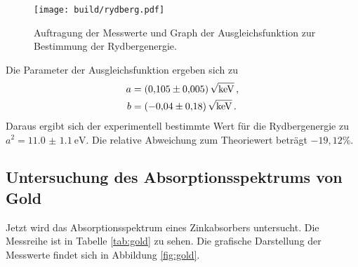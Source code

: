 \begin{figure}
  \centering
  \texttt{[image: build/rydberg.pdf]}
  \caption{Auftragung der Messwerte und Graph der Ausgleichsfunktion zur Bestimmung der Rydbergenergie.}
  \label{fig:rydberg}
\end{figure}

Die Parameter der Ausgleichsfunktion ergeben sich zu
\begin{align*}
  a &= \SI{0.105(5)}{\sqrt{\kilo\eV}} \,,\\
  b &= \SI{-0.04(18)}{\sqrt{\kilo\eV}}\,.
\end{align*}
Daraus ergibt sich der experimentell bestimmte Wert für die Rydbergenergie zu
$a^2 = \SI{11.0(11)}{\eV}$. Die relative Abweichung zum Theoriewert beträgt $-19{,}12\%$.

\subsection{Untersuchung des Absorptionsspektrums von Gold}
\label{subsec:gold}

Jetzt wird das Absorptionsspektrum eines Zinkabsorbers untersucht.
Die Messreihe ist in Tabelle \ref{tab:gold} zu sehen. Die grafische Darstellung der Messwerte
findet sich in Abbildung \ref{fig:gold}.

